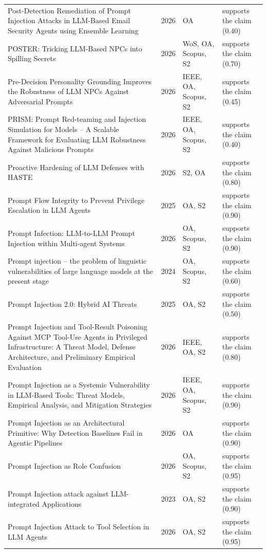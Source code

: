 \begin{longtable}{@{}%
  >{\raggedright\arraybackslash}p{}c%
  >{\raggedright\arraybackslash}p{}%
  >{\raggedright\arraybackslash}p{}@{}}
Post-Detection Remediation of Prompt Injection Attacks in LLM-Based Email Security Agents using Ensemble Learning & 2026 & OA & supports the claim (0.40) \\
POSTER: Tricking LLM-Based NPCs into Spilling Secrets & 2026 & WoS, OA, Scopus, S2 & supports the claim (0.70) \\
Pre-Decision Personality Grounding Improves the Robustness of LLM NPCs Against Adversarial Prompts & 2026 & IEEE, OA, Scopus, S2 & supports the claim (0.45) \\
PRISM: Prompt Red-teaming and Injection Simulation for Models -- A Scalable Framework for Evaluating LLM Robustness Against Malicious Prompts & 2026 & IEEE, OA, Scopus, S2 & supports the claim (0.40) \\
Proactive Hardening of LLM Defenses with HASTE & 2026 & S2, OA & supports the claim (0.80) \\
Prompt Flow Integrity to Prevent Privilege Escalation in LLM Agents & 2025 & OA, S2 & supports the claim (0.90) \\
Prompt Infection: LLM-to-LLM Prompt Injection within Multi-agent Systems & 2026 & OA, Scopus, S2 & supports the claim (0.90) \\
Prompt injection -- the problem of linguistic vulnerabilities of large language models at the present stage & 2024 & OA, Scopus, S2 & supports the claim (0.60) \\
Prompt Injection 2.0: Hybrid AI Threats & 2025 & OA, S2 & supports the claim (0.50) \\
Prompt Injection and Tool-Result Poisoning Against MCP Tool-Use Agents in Privileged Infrastructure: A Threat Model, Defense Architecture, and Preliminary Empirical Evaluation & 2026 & IEEE, OA, S2 & supports the claim (0.80) \\
Prompt Injection as a Systemic Vulnerability in LLM-Based Tools: Threat Models, Empirical Analysis, and Mitigation Strategies & 2026 & IEEE, OA, Scopus, S2 & supports the claim (0.90) \\
Prompt Injection as an Architectural Primitive: Why Detection Baselines Fail in Agentic Pipelines & 2026 & OA & supports the claim (0.90) \\
Prompt Injection as Role Confusion & 2026 & OA, Scopus, S2 & supports the claim (0.95) \\
Prompt Injection attack against LLM-integrated Applications & 2023 & OA, S2 & supports the claim (0.90) \\
Prompt Injection Attack to Tool Selection in LLM Agents & 2026 & OA, S2 & supports the claim (0.95) \\

\end{longtable}
